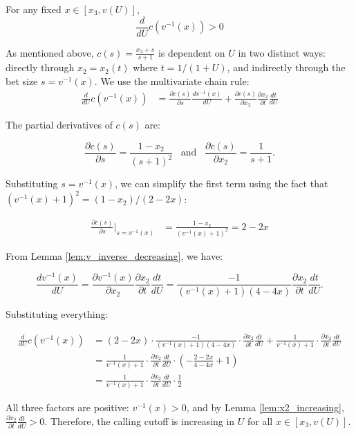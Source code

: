 \documentclass[../../main/main.tex]{subfiles}
\begin{document}
\begin{lemma}
    \label{lem:c_increasing}
    For any fixed $x \in [x_3, v(U)]$,
    \[
        \frac{d}{dU} c(v^{-1}(x)) > 0
    \]
\end{lemma}

\begin{customproof}
    As mentioned above, $c(s) = \frac{x_2 + s}{s+1}$ is dependent on $U$ in two distinct ways: directly through $x_2 = x_2(t)$ where $t = 1/(1+U)$, and indirectly through the bet size $s = v^{-1}(x)$. We use the multivariate chain rule:
    \begin{align*}
        \frac{d}{dU} c(v^{-1}(x)) & = \frac{\partial c(s)}{\partial s} \frac{d v^{-1}(x)}{d U} + \frac{\partial c(s)}{\partial x_2} \frac{\partial x_2}{\partial t} \frac{dt}{dU}
    \end{align*}

    The partial derivatives of $c(s)$ are:

    $$ \frac{\partial c(s)}{\partial s} = \frac{1-x_2}{(s+1)^2} \; \; \; \text{and} \; \; \; \frac{\partial c(s)}{\partial x_2} = \frac{1}{s+1}. $$

    Substituting $s = v^{-1}(x)$, we can simplify the first term using the fact that $(v^{-1}(x)+1)^2 = (1-x_2)/(2-2x)$:

    \begin{align*}
        \frac{\partial c(s)}{\partial s} \bigg|_{s=v^{-1}(x)} & = \frac{1-x_2}{(v^{-1}(x)+1)^2} = 2-2x
    \end{align*}

    From Lemma \ref{lem:v_inverse_decreasing}, we have:

    $$ \frac{d v^{-1}(x)}{d U} = \frac{\partial v^{-1}(x)}{\partial x_2} \frac{\partial x_2}{\partial t} \frac{dt}{dU} = \frac{-1}{(v^{-1}(x)+1)(4-4x)} \frac{\partial x_2}{\partial t} \frac{dt}{dU}. $$

    Substituting everything:

    \begin{align*}
        \frac{d}{dU} c(v^{-1}(x)) & =
        (2-2x) \cdot \frac{-1}{(v^{-1}(x)+1)(4-4x)} \cdot \frac{\partial x_2}{\partial t} \frac{dt}{dU}
        + \frac{1}{v^{-1}(x)+1} \cdot \frac{\partial x_2}{\partial t} \frac{dt}{dU}\\
        & = \frac{1}{v^{-1}(x)+1} \cdot \frac{\partial x_2}{\partial t} \frac{dt}{dU} \cdot \left( -\frac{2-2x}{4-4x} + 1\right) \\
        & = \frac{1}{v^{-1}(x)+1} \cdot \frac{\partial x_2}{\partial t} \frac{dt}{dU} \cdot \frac{1}{2}
    \end{align*}

    All three factors are positive: $v^{-1}(x) > 0$, and by Lemma \ref{lem:x2_increasing}, $\frac{\partial x_2}{\partial t} \frac{dt}{dU} > 0$. Therefore, the calling cutoff is increasing in $U$ for all $x \in [x_3, v(U)]$.

\end{customproof}
\end{document}
